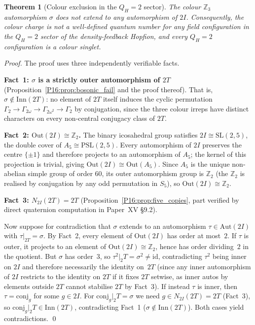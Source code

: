 \documentclass[11pt,a4paper]{article}
\newtheorem{theorem}{Theorem}[section]
\theoremstyle{definition}\newtheorem{definition}[theorem]{Definition}
\theoremstyle{remark}
\theoremstyle{definition}\newtheorem{construction}[theorem]{Construction}
\newcommand{\twoI}{2I}
\newcommand{\twoT}{2T}
\newcommand{\QH}{Q_H}
\begin{document}
\begin{theorem}[Colour exclusion in the $\QH=2$ sector]
\label{P16:thm:colour_exclusion}
The colour $\mathbb{Z}_3$ automorphism $\sigma$ does not extend to any
automorphism of $\twoI$. Consequently, the colour charge is not a
well-defined quantum number for any field configuration in the
$\QH=2$ sector of the density-feedback Hopfion, and every $\QH=2$
configuration is a colour singlet.
\end{theorem}

\begin{proof}
The proof uses three independently verifiable facts.

\textbf{Fact~1: $\sigma$ is a strictly outer automorphism of $\twoT$}
(Proposition~\ref{P16:prop:bosonic_fail} and the proof thereof). That is,
$\sigma\notin\mathrm{Inn}(\twoT)$: no element of $\twoT$ itself
induces the cyclic permutation
$\Gamma_2\to\Gamma_{2\omega}\to\Gamma_{2\omega^2}\to\Gamma_2$ by
conjugation, since the three colour irreps have distinct characters on
every non-central conjugacy class of $\twoT$.

\textbf{Fact~2: $\mathrm{Out}(\twoI)\cong\mathbb{Z}_2$.}
The binary icosahedral group satisfies $\twoI\cong\mathrm{SL}(2,5)$,
the double cover of $A_5\cong\mathrm{PSL}(2,5)$. Every automorphism
of $\twoI$ preserves the centre $\{\pm1\}$ and therefore projects to
an automorphism of $A_5$; the kernel of this projection is trivial,
giving $\mathrm{Out}(\twoI)\cong\mathrm{Out}(A_5)$. Since $A_5$ is
the unique non-abelian simple group of order $60$, its outer
automorphism group is $\mathbb{Z}_2$ (the $\mathbb{Z}_2$ is realised
by conjugation by any odd permutation in $S_5$), so
$\mathrm{Out}(\twoI)\cong\mathbb{Z}_2$.

\textbf{Fact~3: $N_{\twoI}(\twoT)=\twoT$} (Proposition~\ref{P16:prop:five_copies},
part verified by direct quaternion computation in Paper~XV §9.2).

Now suppose for contradiction that $\sigma$ extends to an automorphism
$\tau\in\mathrm{Aut}(\twoI)$ with $\tau|_{\twoT}=\sigma$. By
Fact~2, every element of $\mathrm{Out}(\twoI)$ has order at most~$2$.
If $\tau$ is outer, it projects to an element of
$\mathrm{Out}(\twoI)\cong\mathbb{Z}_2$, hence has order dividing~$2$
in the quotient. But $\sigma$ has order~$3$, so $\tau^2|_\twoT =
\sigma^2\neq\mathrm{id}$, contradicting $\tau^2$ being inner on
$\twoI$ and therefore necessarily the identity on~$\twoT$ (since any
inner automorphism of $\twoI$ restricts to the identity on $\twoT$ if
it fixes $\twoT$ setwise, as inner autos by elements outside $\twoT$
cannot stabilise $\twoT$ by Fact~3). If instead $\tau$ is inner, then
$\tau=\mathrm{conj}_g$ for some $g\in\twoI$. For
$\mathrm{conj}_g|_\twoT=\sigma$ we need $g\in N_{\twoI}(\twoT)=\twoT$
(Fact~3), so $\mathrm{conj}_g|_\twoT\in\mathrm{Inn}(\twoT)$,
contradicting Fact~1 ($\sigma\notin\mathrm{Inn}(\twoT)$). Both cases
yield contradictions. \qed


\end{proof}
\end{document}
